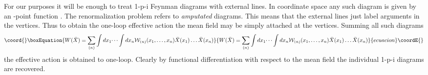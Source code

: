 \documentclass[a4paper,12pt]{article}
\begin{document}
For our purposes it will be enough to treat 
1-p-i Feynman diagrams 
with \coordHE{} external lines. In coordinate space any such diagram
is given by an \coordHE{}-point function \coordHE{}.
The renormalization problem refers to
{\it amputated} diagrams. This means that the external
lines just label arguments in the  vertices. Thus to obtain the 
one-loop effective action the mean field
\coordHE{} may be simply attached at the vertices. 
Summing all such diagrams 
\begin{equation}\coord{}\boxEquation{
W(\bar X)=\sum_{(n)} \int dx_1 \dots \int dx_n 
{\cal W}_{(n)}(x_1,\dots ,x_n) \bar X(x_1) \dots \bar X(x_n)
\label{effact}
}{
W(\bar X)=\sum_{(n)} \int dx_1 \dots \int dx_n 
{\cal W}_{(n)}(x_1,\dots ,x_n) \bar X(x_1) \dots \bar X(x_n)
}{ecuacion}\coordE{}\end{equation}
the effective action \coordHE{} is obtained to one-loop. Clearly 
by functional differentiation with respect to the mean field \coordHE{}
the individual 1-p-i diagrams are recovered. 
\end{document}
